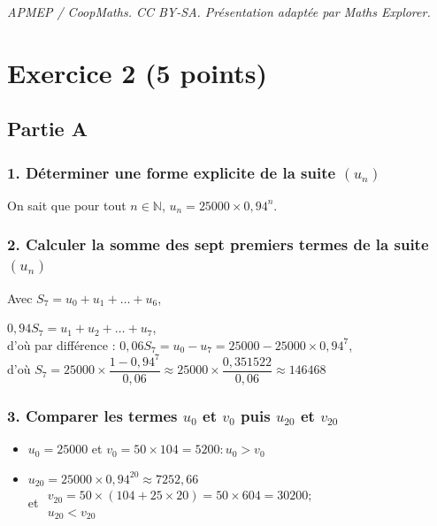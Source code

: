 \documentclass[10pt]{article}
\begin{document}
\noindent\textit{APMEP / CoopMaths. CC BY-SA. Présentation adaptée par Maths Explorer.}\par\medskip
\section*{Exercice 2 (5 points)}
	
	\subsection*{Partie A}
	

	\subsubsection*{1. Déterminer une forme explicite de la suite $(u_n)$}
	
	On sait que pour tout $n \in \mathbb{N}$, $u_n = 25000 \times 0,94^n$.
	
	\subsubsection*{2. Calculer la somme des sept premiers termes de la suite $(u_n)$}
	
	Avec $S_7 = u_0 + u_1 + \dots + u_6$,
	
$
	0,94S_7 = u_1 + u_2 + \dots + u_7$, \\
	 d’où par différence : $ 0,06S_7 = u_0 - u_7 = 25000 - 25000 \times 0,94^7$,\\ 
	  d’où $	S_7 = 25000 \times \dfrac{1 - 0,94^7}{0,06} \approx 25000 \times \dfrac{0,351522}{0,06} \approx 146468$

	
	\subsubsection*{3. Comparer les termes $u_0$ et $v_0$ puis $u_{20}$ et $v_{20}$}
	
	\begin{itemize}
		\item $u_0 = 25000$ et $v_0 = 50 \times 104 = 5200 : u_0 > v_0$
		\item $u_{20} = 25000 \times 0,94^{20} \approx 7252,66$ \\
		et $\begin{gathered}v_{20} = 50 \times (104 + 25 \times 20) = 50 \times 604 = 30200;\\ u_{20} < v_{20}\end{gathered}$
	\end{itemize}
	
\end{document}
